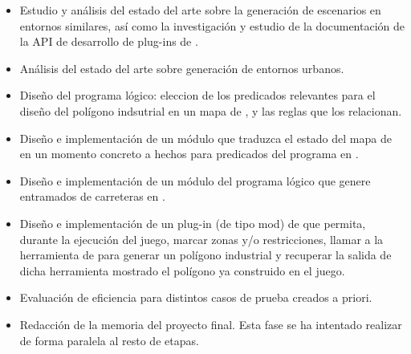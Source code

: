 \begin{itemize}
	\item Estudio y análisis del estado del arte sobre la generación de escenarios en entornos similares, así como la investigación y estudio de la documentación de la API de desarrollo de plug-ins de \cities. 
	\item Análisis del estado del arte sobre generación de entornos urbanos.
	\item Diseño del programa lógico: eleccion de los predicados relevantes para el diseño del polígono indsutrial en un mapa de \cities, y las reglas que los relacionan.
	\item Diseño e implementación de un módulo que traduzca el estado del mapa de \cities en un momento concreto a hechos para predicados del programa en \asp.
	\item Diseño e implementación de un módulo del programa lógico que genere entramados de carreteras en \asp.
	\item Diseño e implementación de un plug-in (de tipo mod) de \cities que permita, durante la ejecución del juego, marcar zonas y/o restricciones, llamar a la herramienta de \asp para generar un polígono industrial y recuperar la salida de dicha herramienta mostrado el polígono ya construido en el juego.
	\item Evaluación de eficiencia para distintos casos de prueba creados a priori.
	\item Redacción de la memoria del proyecto final. Esta fase se ha intentado realizar de forma paralela al resto de etapas.
\end{itemize}